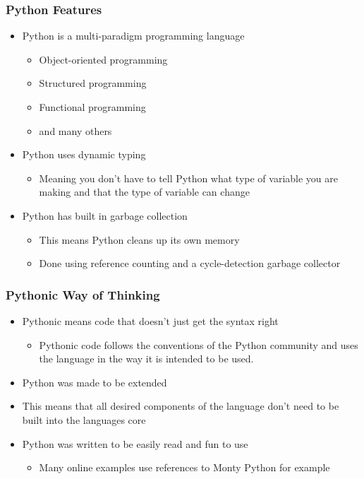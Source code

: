 \documentclass[mini frame in current subsection]{beamer}
\begin{document}
		\begin{frame}
			\frametitle{Python Features}
			\begin{itemize}
				\vfill \item  Python is a multi-paradigm programming language
					\begin{itemize}
						\item  Object-oriented programming
						\item  Structured programming
						\item  Functional programming
						\item  and many others
					\end{itemize}
				\vfill \item  Python uses dynamic typing
					\begin{itemize}
						\item Meaning you don't have to tell Python what type of variable you are making and that the type of variable can change
					\end{itemize}
				\vfill \item  Python has built in garbage collection
					\begin{itemize}
						\item  This means Python cleans up its own memory
						\item  Done using reference counting and a cycle-detection garbage collector
					\end{itemize}
			\end{itemize}
		\end{frame}
	
		\begin{frame}
			\frametitle{Pythonic Way of Thinking}
			\begin{itemize}
				\vfill \item  Pythonic means code that doesn't just get the syntax right 
					\begin{itemize}
						\item Pythonic code follows the conventions of the Python community and uses the language in the way it is intended to be used.
					\end{itemize}
				\vfill \item  Python was made to be extended
				\vfill \item  This means that all desired components of the language don't need to be built into the languages core
				\vfill \item  Python was written to be easily read and fun to use
					\begin{itemize}
						\item  Many online examples use references to Monty Python for example
					\end{itemize}
			\end{itemize}
		\end{frame}
		
\end{document}
